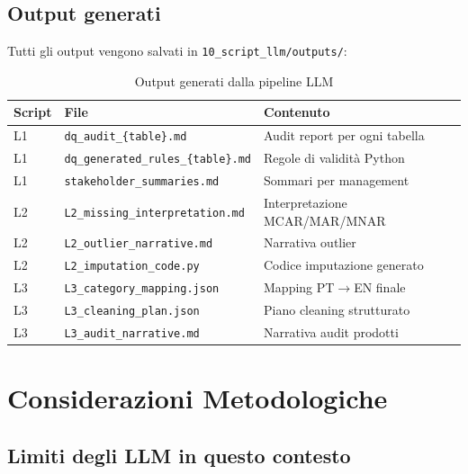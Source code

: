 \documentclass[12pt,a4paper]{article}
\begin{document}
\subsection{Output generati}

Tutti gli output vengono salvati in \texttt{10\_script\_llm/outputs/}:

\begin{table}[H]
  \centering
  \begin{tabular}{lll}
    \toprule
    \textbf{Script} & \textbf{File} & \textbf{Contenuto} \\
    \midrule
    L1 & \texttt{dq\_audit\_\{table\}.md} & Audit report per ogni tabella \\
    L1 & \texttt{dq\_generated\_rules\_\{table\}.md} & Regole di validità Python \\
    L1 & \texttt{stakeholder\_summaries.md} & Sommari per management \\
    L2 & \texttt{L2\_missing\_interpretation.md} & Interpretazione MCAR/MAR/MNAR \\
    L2 & \texttt{L2\_outlier\_narrative.md} & Narrativa outlier \\
    L2 & \texttt{L2\_imputation\_code.py} & Codice imputazione generato \\
    L3 & \texttt{L3\_category\_mapping.json} & Mapping PT$\to$EN finale \\
    L3 & \texttt{L3\_cleaning\_plan.json} & Piano cleaning strutturato \\
    L3 & \texttt{L3\_audit\_narrative.md} & Narrativa audit prodotti \\
    \bottomrule
  \end{tabular}
  \caption{Output generati dalla pipeline LLM}
\end{table}

\section{Considerazioni Metodologiche}

\subsection{Limiti degli LLM in questo contesto}
\end{document}
